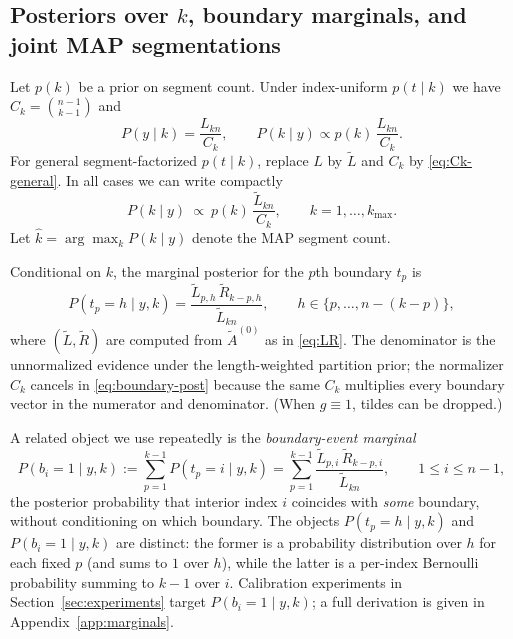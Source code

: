 \subsection[Posteriors over segment counts, boundary marginals, and joint MAP segmentations]{Posteriors over $k$, boundary marginals, and joint MAP segmentations}
Let $p(k)$ be a prior on segment count. Under index-uniform $p(t\mid k)$ we have
$C_k=\binom{n-1}{k-1}$ and
\[
P(y\mid k) = \frac{L_{k n}}{C_k},
\qquad
P(k\mid y)\propto p(k)\,\frac{L_{k n}}{C_k}.
\]
For general segment-factorized $p(t\mid k)$, replace $L$ by $\widetilde{L}$ and $C_k$ by
\eqref{eq:Ck-general}. In all cases we can write compactly
\begin{equation}
P(k\mid y)\ \propto\ p(k)\,\frac{\widetilde{L}_{k n}}{C_k},
\qquad k=1,\dots,k_{\max}.
\label{eq:post-k}
\end{equation}
Let $\widehat{k}=\arg\max_k P(k\mid y)$ denote the MAP segment count.

Conditional on $k$, the marginal posterior for the $p$th boundary $t_p$ is
\begin{equation}
P(t_p=h\mid y,k)
 = \frac{\widetilde{L}_{p,h}\,\widetilde{R}_{k-p,h}}{\widetilde{L}_{k n}},
\qquad
h\in\{p,\dots,n-(k-p)\},
\label{eq:boundary-post}
\end{equation}
where $(\widetilde{L},\widetilde{R})$ are computed from $\widetilde{A}^{(0)}$ as in
\eqref{eq:LR}. The denominator is the unnormalized evidence under the length-weighted partition
prior; the normalizer $C_k$ cancels in \eqref{eq:boundary-post} because the same $C_k$ multiplies
every boundary vector in the numerator and denominator. (When $g\equiv 1$, tildes can be dropped.)

\begin{remark}
\label{rem:boundary-event}
A related object we use repeatedly is the \emph{boundary-event marginal}
\begin{equation}
P(b_i=1\mid y,k)
 := \sum_{p=1}^{k-1} P(t_p=i\mid y,k)
 = \sum_{p=1}^{k-1}\frac{\widetilde{L}_{p,i}\,\widetilde{R}_{k-p,i}}{\widetilde{L}_{k n}},
 \qquad 1\le i\le n-1,
\label{eq:boundary-event}
\end{equation}
the posterior probability that interior index $i$ coincides with \emph{some} boundary, without
conditioning on which boundary. The objects $P(t_p=h\mid y,k)$ and $P(b_i=1\mid y,k)$ are
distinct: the former is a probability distribution over $h$ for each fixed $p$ (and sums to $1$ over
$h$), while the latter is a per-index Bernoulli probability summing to $k-1$ over $i$. Calibration
experiments in Section~\ref{sec:experiments} target $P(b_i=1\mid y,k)$; a full derivation is given
in Appendix~\ref{app:marginals}.
\end{remark}


